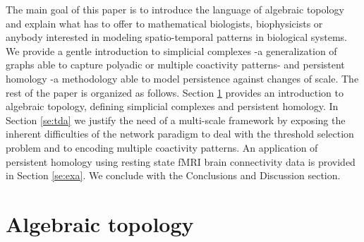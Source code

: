 \documentclass[onecollarge,runningheads]{svjour2}
\begin{document}
The main goal of this paper is to introduce the language of algebraic topology and explain what has to offer to mathematical biologists, biophysicists or anybody interested in modeling spatio-temporal patterns in biological systems.
We provide a gentle introduction to simplicial complexes -a generalization of graphs able to capture polyadic or multiple coactivity patterns- and persistent  homology -a methodology able to model persistence against changes of scale.
The rest of the paper is organized as follows. Section \ref{se:at} provides an introduction to algebraic topology, defining simplicial complexes and persistent homology.
In Section \ref{se:tda} we justify the need of a multi-scale framework by exposing the inherent difficulties of the network paradigm to deal with the threshold selection problem and to encoding multiple coactivity patterns. 
An application of persistent homology using resting state fMRI brain connectivity data is provided in Section \ref{se:exa}. We conclude with the Conclusions and Discussion section.


\section{Algebraic topology}  %
\label{se:at}
\end{document}
